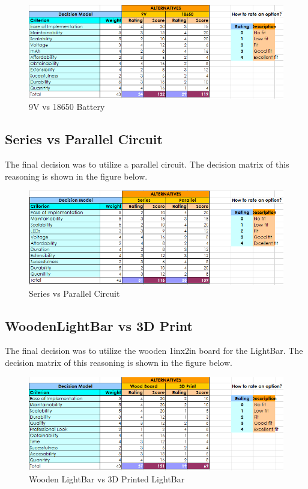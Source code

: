 \documentclass[12pt]{article}
\begin{document}
{{{				\begin{figure}[ht!]
					\centering
					\includegraphics[width=120mm]{assets/9V_vs_18650.png}
					\caption{9V vs 18650 Battery \label{overflow}}
				\end{figure}
		
		\subsection{Series vs Parallel Circuit}
			The final decision was to utilize a parallel circuit. The decision matrix of this reasoning is shown in the figure below.
			
			\begin{figure}[ht!]
				\centering
				\includegraphics[width=120mm]{assets/Series_vs_Parallel.png}
				\caption{Series vs Parallel Circuit \label{overflow}}
			\end{figure}
		
		\subsection{WoodenLightBar vs 3D Print}
			The final decision was to utilize the wooden 1inx2in board for the LightBar. The decision matrix of this reasoning is shown in the figure below.
			
			\begin{figure}[ht!]
				\centering
				\includegraphics[width=120mm]{assets/Wood_vs_3D}
				\caption{Wooden LightBar vs 3D Printed LightBar \label{overflow}}
			\end{figure}
			
}}}
\end{document}
